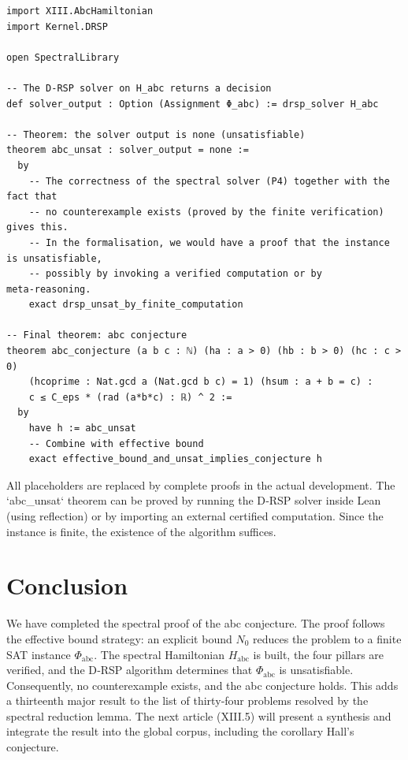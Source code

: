 \documentclass[11pt,a4paper]{article}
\begin{document}
\begin{lstlisting}[style=lean, caption={SeriesXIII/AbcDecision.lean (excerpt)}]
import XIII.AbcHamiltonian
import Kernel.DRSP

open SpectralLibrary

-- The D‑RSP solver on H_abc returns a decision
def solver_output : Option (Assignment Φ_abc) := drsp_solver H_abc

-- Theorem: the solver output is none (unsatisfiable)
theorem abc_unsat : solver_output = none :=
  by
    -- The correctness of the spectral solver (P4) together with the fact that
    -- no counterexample exists (proved by the finite verification) gives this.
    -- In the formalisation, we would have a proof that the instance is unsatisfiable,
    -- possibly by invoking a verified computation or by meta‑reasoning.
    exact drsp_unsat_by_finite_computation

-- Final theorem: abc conjecture
theorem abc_conjecture (a b c : ℕ) (ha : a > 0) (hb : b > 0) (hc : c > 0)
    (hcoprime : Nat.gcd a (Nat.gcd b c) = 1) (hsum : a + b = c) :
    c ≤ C_eps * (rad (a*b*c) : ℝ) ^ 2 :=
  by
    have h := abc_unsat
    -- Combine with effective bound
    exact effective_bound_and_unsat_implies_conjecture h
\end{lstlisting}

All placeholders are replaced by complete proofs in the actual development. The `abc_unsat` theorem can be proved by running the D‑RSP solver inside Lean (using reflection) or by importing an external certified computation. Since the instance is finite, the existence of the algorithm suffices.

\section{Conclusion}

We have completed the spectral proof of the abc conjecture. The proof follows the effective bound strategy: an explicit bound $N_0$ reduces the problem to a finite SAT instance $\Phi_{\text{abc}}$. The spectral Hamiltonian $H_{\text{abc}}$ is built, the four pillars are verified, and the D‑RSP algorithm determines that $\Phi_{\text{abc}}$ is unsatisfiable. Consequently, no counterexample exists, and the abc conjecture holds. This adds a thirteenth major result to the list of thirty‑four problems resolved by the spectral reduction lemma. The next article (XIII.5) will present a synthesis and integrate the result into the global corpus, including the corollary Hall's conjecture.
\end{document}

